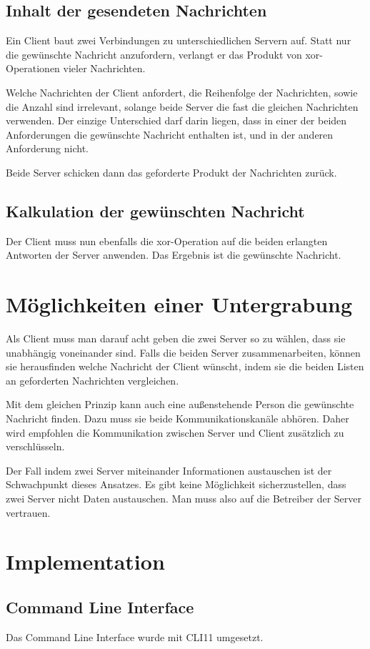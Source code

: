 \documentclass[]{article}
\begin{document}
\subsection{Inhalt der gesendeten Nachrichten}
Ein Client baut zwei Verbindungen zu unterschiedlichen Servern auf. Statt nur die gewünschte Nachricht anzufordern, verlangt er das Produkt von xor-Operationen vieler Nachrichten.

Welche Nachrichten der Client anfordert, die Reihenfolge der Nachrichten, sowie die Anzahl sind irrelevant, solange beide Server die fast die gleichen Nachrichten verwenden. Der einzige Unterschied darf darin liegen, dass in einer der beiden Anforderungen die gewünschte Nachricht enthalten ist, und in der anderen Anforderung nicht.

Beide Server schicken dann das geforderte Produkt der Nachrichten zurück.

\subsection{Kalkulation der gewünschten Nachricht}
Der Client muss nun ebenfalls die xor-Operation auf die beiden erlangten Antworten der Server anwenden. Das Ergebnis ist die gewünschte Nachricht.

\section{Möglichkeiten einer Untergrabung}
Als Client muss man darauf acht geben die zwei Server so zu wählen, dass sie unabhängig voneinander sind. Falls die beiden Server zusammenarbeiten, können sie herausfinden welche Nachricht der Client wünscht, indem sie die beiden Listen an geforderten Nachrichten vergleichen.

Mit dem gleichen Prinzip kann auch eine außenstehende Person die gewünschte Nachricht finden. Dazu muss sie beide Kommunikationskanäle abhören. Daher wird empfohlen die Kommunikation zwischen Server und Client zusätzlich zu verschlüsseln.

Der Fall indem zwei Server miteinander Informationen austauschen ist der Schwachpunkt dieses Ansatzes. Es gibt keine Möglichkeit sicherzustellen, dass zwei Server nicht Daten austauschen. Man muss also auf die Betreiber der Server vertrauen.

\section{Implementation}
\subsection{Command Line Interface}
Das Command Line Interface wurde mit CLI11 umgesetzt.
\end{document}
